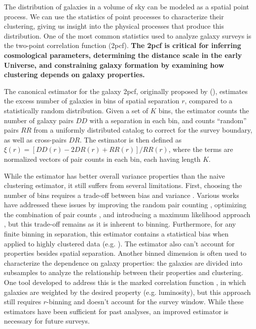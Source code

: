 \documentclass[12pt, fullpage, letterpaper]{article}
\newcommand{\cf}{2pcf\xspace}
\newcommand{\LS}{\acronym{LS}\xspace}
\begin{document}
The distribution of galaxies in a volume of sky can be modeled as a spatial point process.
We can use the statistics of point processes to characterize their clustering, giving us insight into the physical processes that produce this distribution.
One of the most common statistics used to analyze galaxy surveys is the two-point correlation function (\cf). 
\textbf{The \cf is critical for inferring cosmological parameters, determining the distance scale in the early Universe, and constraining galaxy formation by examining how clustering depends on galaxy properties.}
 
The canonical estimator for the galaxy \cf, originally proposed by \cite{LandySzalay1993} (\LS), estimates the excess number of galaxies in bins of spatial separation $r$, compared to a statistically random distribution.
Given a set of $K$ bins, the \LS estimator counts the number of galaxy pairs $DD$ with a separation in each bin, and counts ``random'' pairs $RR$ from a uniformly distributed catalog  to correct for the survey boundary, as well as cross-pairs $DR$.
The estimator is then defined as $\xi(r) = [DD(r) - 2DR(r) + RR(r)]/RR(r)$,
where the terms are normalized vectors of pair counts in each bin, each having length $K$.

While the \LS estimator has better overall variance properties than the naive clustering estimator, it still suffers from several limitations. 
First, choosing the number of bins requires a trade-off between bias and variance \citep{Bailoni2016}.
Various works have addressed these issues by improving the random pair counting \citep{Demina2016}, optimizing the combination of pair counts \citep{VargasMagana2013}, and introducing a maximum likelihood approach \citep{BaxterRozo2013}, but this trade-off remains as it is inherent to binning.
Furthermore, for any finite binning in separation, this estimator contains a statistical bias when applied to highly clustered data (e.g. \citealt{Kerscher1998}). The \LS estimator also can't account for properties besides spatial separation.
Another binned dimension is often used to characterize the dependence
on galaxy properties: the galaxies are divided into subsamples to
analyze the relationship between their properties and clustering.
One tool developed to address this is the marked correlation function \citep{WhitePadmanabhan2009}, in which galaxies are weighted by the desired property (e.g. luminosity), but this approach still requires $r$-binning and doesn't account for the survey window.
While these estimators have been sufficient for past analyses, an improved estimator is necessary for future surveys.
\end{document}
